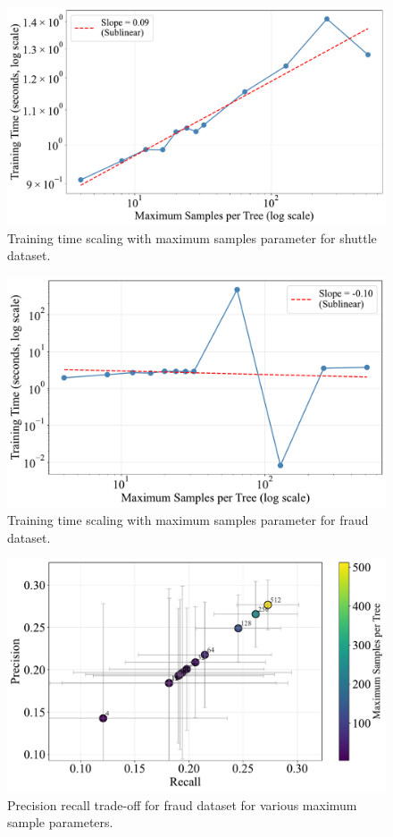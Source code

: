 \documentclass[10pt, conference]{IEEEtran}
\begin{document}
\begin{figure}[H]
	\centering
	\includegraphics[width=0.95\linewidth]{../results/shuttle/max_samples/training_time_scaling.pdf}
	\caption{Training time scaling with maximum samples parameter for shuttle dataset.}
	\label{fig:tt_samples_shuttle}
\end{figure}
\begin{figure}[H]
	\centering
	\includegraphics[width=0.95\linewidth]{../results/fraud/max_samples/training_time_scaling.pdf}
	\caption{Training time scaling with maximum samples parameter for fraud dataset.}
	\label{fig:tt_samples_fraud}
\end{figure}



\begin{figure}[H]
	\centering
	\includegraphics[width=\linewidth]{../results/fraud/max_samples/precision_recall_tradeoff.pdf}
	\caption{Precision recall trade-off for fraud dataset for various maximum sample parameters.}
	\label{fig:max_samples_fraud}
\end{figure}
\end{document}
